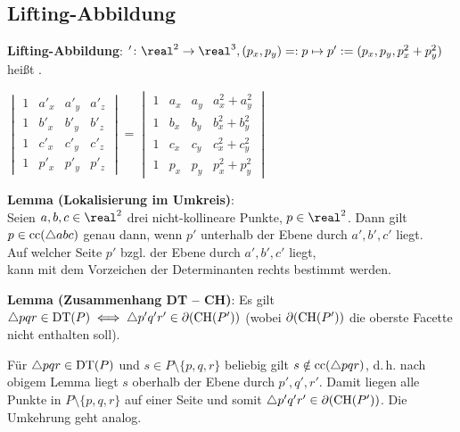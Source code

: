 \subsection{%
    Lifting-Abbildung%
}

\textbf{Lifting-Abbildung}:
$'\colon \real^2 \rightarrow \real^3,
(p_x, p_y) =: p \mapsto p' := (p_x, p_y, p_x^2 + p_y^2)$
heißt .

\linie

\begin{floatingfigure}[r]{65mm}
    \footnotesize$
    \begin{vmatrix}1 & a'_x & a'_y & a'_z\\1 & b'_x & b'_y & b'_z\\
    1 & c'_x & c'_y & c'_z\\1 & p'_x & p'_y & p'_z\end{vmatrix} =
    \begin{vmatrix}1 & a_x & a_y & a_x^2 + a_y^2\\1 & b_x & b_y & b_x^2 + b_y^2\\
    1 & c_x & c_y & c_x^2 + c_y^2\\1 & p_x & p_y & p_x^2 + p_y^2\end{vmatrix}$
\end{floatingfigure}

\textbf{Lemma (Lokalisierung im Umkreis)}:\\
Seien $a, b, c \in \real^2$ drei nicht-kollineare Punkte, $p \in \real^2$.
Dann gilt $p \in \operatorname{cc}(\triangle abc)$ genau dann, wenn $p'$ unterhalb der Ebene durch $a', b', c'$
liegt.\\
Auf welcher Seite $p'$ bzgl. der Ebene durch $a', b', c'$ liegt,\\
kann mit dem Vorzeichen der Determinanten rechts bestimmt werden.

\linie

\textbf{Lemma (Zusammenhang DT -- CH)}:
Es gilt $\triangle pqr \in \operatorname{DT}(P) \iff \triangle p'q'r' \in \partial(\operatorname{CH}(P'))$
(wobei $\partial(\operatorname{CH}(P'))$ die oberste Facette nicht enthalten soll).

\begin{Beweis}
    Für $\triangle pqr \in \operatorname{DT}(P)$ und $s \in P \setminus \{p, q, r\}$ beliebig gilt
    $s \notin \operatorname{cc}(\triangle pqr)$, d.\,h. nach obigem Lemma
    liegt $s$ oberhalb der Ebene durch $p', q', r'$.
    Damit liegen alle Punkte in $P \setminus \{p, q, r\}$ auf einer Seite und somit
    $\triangle p'q'r' \in \partial(\operatorname{CH}(P'))$.
    Die Umkehrung geht analog.
\end{Beweis}

